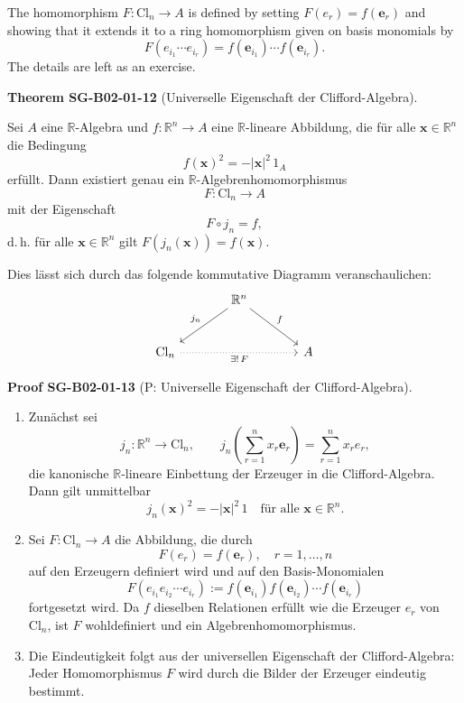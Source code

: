 \documentclass[10pt, letterpaper]{article}
\newcommand{\CustomHeading}[3]{%
  \par\medskip\noindent%
  \textbf{#1 #2} \textnormal{(#3)}.\enskip%
}
\newenvironment{THEO}[2]{\begin{unitbox}\CustomHeading{Theorem}{#1}{#2}}{\end{unitbox}}
\newenvironment{PROOF}[2]{\begin{unitbox}\CustomHeading{Proof}{#1}{#2}}{\end{unitbox}}
\begin{document}
The homomorphism $F: \mathrm{Cl}_{n} \longrightarrow A$ is defined by setting $F\left(e_{r}\right)=f\left(\mathbf{e}_{r}\right)$ and showing that it extends it to a ring homomorphism given on basis monomials by
$$
F\left(e_{i_{1}} \cdots e_{i_{r}}\right)=f\left(\mathbf{e}_{i_{1}}\right) \cdots f\left(\mathbf{e}_{i_{r}}\right) .
$$
The details are left as an exercise.



\begin{THEO}{SG-B02-01-12}{Universelle Eigenschaft der Clifford-Algebra}
Sei $A$ eine $\mathbb{R}$\nobreakdash-Algebra und $f : \mathbb{R}^n \to A$ eine $\mathbb{R}$\nobreakdash-lineare Abbildung, die für alle $\mathbf{x} \in \mathbb{R}^n$ die Bedingung
\[
f(\mathbf{x})^2 = -\lvert \mathbf{x}\rvert^2 \, 1_A
\]
erfüllt.
Dann existiert genau ein $\mathbb{R}$\nobreakdash-Algebrenhomomorphismus 
\[
F : \mathrm{Cl}_n \longrightarrow A
\]
mit der Eigenschaft
\[
F \circ j_n = f,
\]
d.\,h. für alle $\mathbf{x} \in \mathbb{R}^n$ gilt $F(j_n(\mathbf{x})) = f(\mathbf{x})$.

Dies lässt sich durch das folgende kommutative Diagramm veranschaulichen:
\[
\begin{tikzcd}[row sep=large, column sep=large]
& \mathbb{R}^n \arrow[dl, "j_n"'] \arrow[dr, "f"] & \\
\mathrm{Cl}_n \arrow[rr, dotted, "{\exists!\,F}"'] & & A
\end{tikzcd}
\]
\end{THEO}


\begin{PROOF}{SG-B02-01-13}{P: Universelle Eigenschaft der Clifford-Algebra}
\begin{enumerate}
\item
Zunächst sei 
\[
j_n : \mathbb{R}^n \to \mathrm{Cl}_n, \qquad 
j_n\!\left(\sum_{r=1}^n x_r \mathbf{e}_r\right)
= \sum_{r=1}^n x_r e_r,
\]
die kanonische $\mathbb{R}$\nobreakdash-lineare Einbettung der Erzeuger in die Clifford-Algebra.  
Dann gilt unmittelbar
\[
j_n(\mathbf{x})^2 = -\lvert \mathbf{x}\rvert^2 \, 1
\quad\text{für alle }\mathbf{x}\in\mathbb{R}^n.
\]
\item
Sei $F : \mathrm{Cl}_n \to A$ die Abbildung, die durch
\[
F(e_r) = f(\mathbf{e}_r), \quad r=1,\ldots,n
\]
auf den Erzeugern definiert wird und auf den Basis-Monomialen
\[
F(e_{i_1} e_{i_2} \cdots e_{i_r})
:= f(\mathbf{e}_{i_1}) f(\mathbf{e}_{i_2}) \cdots f(\mathbf{e}_{i_r})
\]
fortgesetzt wird.
Da $f$ dieselben Relationen erfüllt wie die Erzeuger $e_r$ von $\mathrm{Cl}_n$, ist $F$ wohldefiniert und ein Algebrenhomomorphismus.
\item
Die Eindeutigkeit folgt aus der universellen Eigenschaft der Clifford-Algebra:  
Jeder Homomorphismus $F$ wird durch die Bilder der Erzeuger eindeutig bestimmt.
\end{enumerate}
\end{PROOF}
\end{document}
